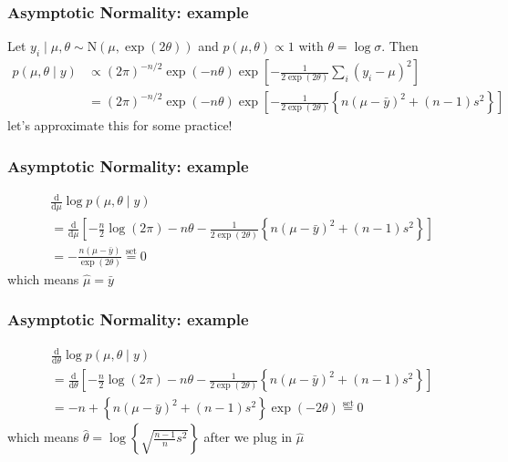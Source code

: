 \documentclass{beamer}
\begin{document}
\begin{frame}
\frametitle{Asymptotic Normality: example}

Let $y_i \mid \mu, \theta \sim \text{N}(\mu, \exp(2\theta))$ and $p(\mu, \theta) \propto 1$ with $\theta = \log \sigma$. Then 
\begin{align*}
p(\mu, \theta \mid y) &\propto (2\pi)^{-n/2} \exp(-n\theta) \exp\left[-\frac{1}{2 \exp(2\theta) } \sum_i (y_i - \mu)^2 \right] \\
&= (2\pi)^{-n/2} \exp(-n\theta) \exp\left[-\frac{1}{2 \exp(2\theta) } \left\{ n(\mu - \bar{y})^2 + (n-1)s^2 \right\} \right]
\end{align*}
let's approximate this for some practice!

\end{frame}

\begin{frame}
\frametitle{Asymptotic Normality: example}

\begin{align*}
&\frac{\text{d}}{\text{d} \mu} \log p(\mu, \theta \mid y) \\
&= \frac{\text{d}}{\text{d} \mu}\left[ -\frac{n}{2}\log(2\pi) -n\theta -\frac{1}{2 \exp(2\theta) } \left\{ n(\mu - \bar{y})^2 + (n-1)s^2 \right\} \right] \\
&=  -\frac{n(\mu - \bar{y})}{ \exp(2\theta) }  \overset{\text{set}}{=} 0 
\end{align*}
which means $\hat{\mu} = \bar{y}$

\end{frame}

\begin{frame}
\frametitle{Asymptotic Normality: example}

\begin{align*}
&\frac{\text{d}}{\text{d} \theta} \log p(\mu, \theta \mid y) \\
&= \frac{\text{d}}{\text{d} \theta }\left[ -\frac{n}{2}\log(2\pi) -n\theta -\frac{1}{2 \exp(2\theta) } \left\{ n(\mu - \bar{y})^2 + (n-1)s^2 \right\} \right] \\
&=  -n + \left\{ n(\mu - \bar{y})^2 + (n-1)s^2 \right\} \exp(-2\theta) \overset{\text{set}}{=} 0 
\end{align*}
which means $\hat{\theta} = \log \left\{ \sqrt{ \frac{n-1}{n}s^2}  \right\}$ after we plug in $\hat{\mu}$

\end{frame}
\end{document}

